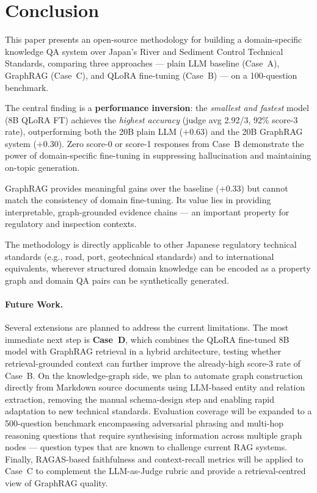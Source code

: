 \documentclass[twocolumn]{article}
\begin{document}
\section{Conclusion}
\label{sec:conclusion}

This paper presents an open-source methodology for building a domain-specific knowledge QA
system over Japan's River and Sediment Control Technical Standards,
comparing three approaches --- plain LLM baseline (Case~A), GraphRAG (Case~C),
and QLoRA fine-tuning (Case~B) --- on a 100-question benchmark.

The central finding is a \textbf{performance inversion}: the \emph{smallest and fastest} model
(8B QLoRA FT) achieves the \emph{highest accuracy} (judge avg 2.92/3, 92\% score-3 rate),
outperforming both the 20B plain LLM ($+0.63$) and the 20B GraphRAG system ($+0.30$).
Zero score-0 or score-1 responses from Case~B demonstrate the power of domain-specific
fine-tuning in suppressing hallucination and maintaining on-topic generation.

GraphRAG provides meaningful gains over the baseline ($+0.33$) but cannot match the
consistency of domain fine-tuning.
Its value lies in providing interpretable, graph-grounded evidence chains ---
an important property for regulatory and inspection contexts.

The methodology is directly applicable to other Japanese regulatory technical
standards (e.g., road, port, geotechnical standards) and to international equivalents,
wherever structured domain knowledge can be encoded as a property graph and
domain QA pairs can be synthetically generated.

\paragraph{Future Work.}
Several extensions are planned to address the current limitations.
The most immediate next step is \textbf{Case~D}, which combines the QLoRA fine-tuned 8B model
with GraphRAG retrieval in a hybrid architecture, testing whether retrieval-grounded context
can further improve the already-high score-3 rate of Case~B.
On the knowledge-graph side, we plan to automate graph construction directly from Markdown
source documents using LLM-based entity and relation extraction, removing the manual
schema-design step and enabling rapid adaptation to new technical standards.
Evaluation coverage will be expanded to a 500-question benchmark encompassing adversarial
phrasing and multi-hop reasoning questions that require synthesising information across
multiple graph nodes --- question types that are known to challenge current RAG systems.
Finally, RAGAS-based faithfulness and context-recall metrics will be applied to Case~C
to complement the LLM-as-Judge rubric and provide a retrieval-centred view of GraphRAG quality.
\end{document}

